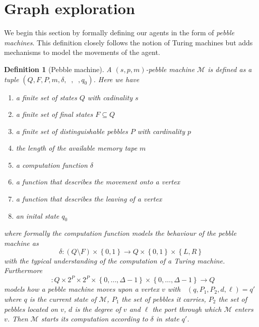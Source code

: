 \documentclass[draft,oneside]{scrartcl}
\newtheorem{definition}{Definition}
\DeclareMathOperator{\din}{\delta_{\mathit{in}}}
\DeclareMathOperator{\dout}{\delta_{\mathit{out}}}
\begin{document}
\section{Graph exploration}
We begin this section by formally defining our agents in the form of
\emph{pebble machines}. This definition closely follows the notion of Turing
machines but adds mechanisms to model the movements of the agent.
\begin{definition}[Pebble machine]
  A $(s,p,m)$-\emph{pebble machine} $\mathcal{M}$ is defined as a tuple
  $(Q,F,P,m,\delta,\din,\dout,q_{0})$. Here we have
  \begin{enumerate}
    \item a finite set of states $Q$ with cadinality $s$
    \item a finite set of final states $F\subseteq Q$
    \item a finite set of distinguishable pebbles $P$ with cardinality $p$
    \item the length of the available memory tape $m$
    \item a computation function $\delta$
    \item a function that describes the movement onto a vertex
      $\din$
    \item a function that describes the leaving of a vertex $\dout$
    \item an inital state $q_{0}$
  \end{enumerate}
  where formally the computation function models the behaviour of the pebble
  machine as
  \begin{equation*}
    \delta\colon (Q\setminus F)\times\left\{0,1\right\}\rightarrow
    Q\times\left\{0,1\right\}\times\left\{L,R\right\}
  \end{equation*}
  with the typical understanding of the computation of a Turing machine.
  Furthermore
  \begin{equation*}
    \din\colon Q\times 2^{P}\times 2^{P}\times
    \left\{0,\dots,\Delta - 1\right\}\times\left\{0,\dots,\Delta - 1\right\}
    \rightarrow Q
  \end{equation*}
  models how a pebble machine moves upon a vertex $v$ with
  $\din(q,P_{1},P_{2},d,\ell) = q'$ where $q$ is the current state of
  $\mathcal{M}$, $P_{1}$ the set of pebbles it carries, $P_{2}$ the set
  of pebbles located on $v$, $d$ is the degree of $v$ and $\ell$ the port
  through which $\mathcal{M}$ enters $v$. Then $\mathcal{M}$ starts its
  computation according to $\delta$ in state $q'$.


\end{definition}
\end{document}
